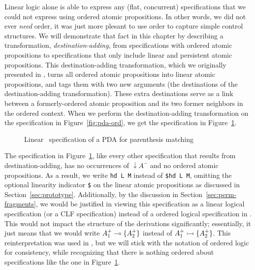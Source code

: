 Linear logic alone is able to express any (flat, concurrent)
specifications that we could not express using ordered atomic
propositions. In other words, we did not ever {\it need} order, it was
just more plesant to use order to capture simple control structures.
%
We will demonstrate that fact in this chapter by 
describing a transformation,
{\it destination-adding}, from specifications with ordered atomic
propositions
to specifications that only include linear and persistent atomic 
propositions. This
destination-adding transformation, which we originally presented in
\cite{simmons11logical}, turns all ordered atomic propositions into
linear atomic propositions, and tags them with two new arguments (the
destinations of the destination-adding transformation). These extra
destinations serve as a link between a formerly-ordered atomic
proposition and its two former neighbors in the ordered context.  When
we perform the destination-adding transformation on the specification
in Figure~\ref{fig:pda-ord}, we get the specification in
Figure~\ref{fig:pda-lin}.

\begin{figure}[ht]
\caption{Linear \sls~specification of a PDA for parenthesis matching}
\label{fig:pda-lin}
\end{figure}

The specification in Figure~\ref{fig:pda-lin}, like every other
specification that results from destination-adding, has no occurrences
of ${\downarrow}A^-$ and no ordered atomic propositions.  As a result,
we write \verb|hd L M| instead of \verb|$hd L M|, omitting the
optional linearity indicator \verb|$| on the linear atomic
propositions as discussed in
Section~\ref{sec:prototype}. Additionally, by the discussion in
Section~\ref{sec:perm-fragments}, we would be justified in viewing
this specification as a linear logical specification (or a CLF
specification) instead of a ordered logical specification in \sls.
This would not impact the structure of the derivations significantly;
essentially, it just means that we would write $A^+_1 \multimap \{ A^+_2
\}$ instead of $A^+_1 \rightarrowtail \{ A^+_2 \}$.  This reinterpretation was
used in \cite{simmons11logical}, but we will stick with the notation
of ordered logic for consistency, while recognizing that there is
nothing ordered about specifications like the one in
Figure~\ref{fig:pda-lin}.

